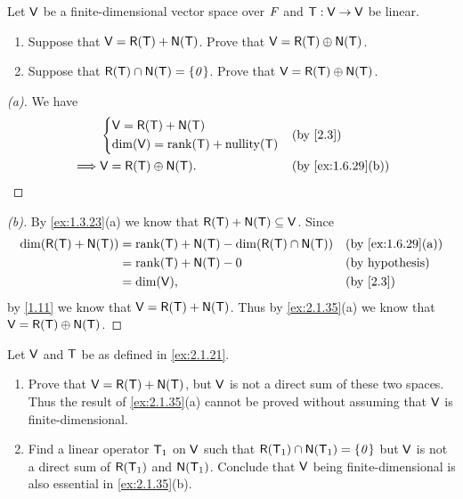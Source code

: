 \begin{ex}\label{ex:2.1.35}
  Let \(\mathsf{V}\) be a finite-dimensional vector space over \(\mathit{F}\) and \(\mathsf{T} : \mathsf{V} \to \mathsf{V}\) be linear.
  \begin{enumerate}
    \item Suppose that \(\V = \rg{\T} + \ns{\T}\).
          Prove that \(\V = \rg{\T} \oplus \ns{\T}\).
    \item Suppose that \(\rg{\T} \cap \ns{\T} = \set{\zv}\).
          Prove that \(\V = \rg{\T} \oplus \ns{\T}\).
  \end{enumerate}
\end{ex}

\begin{proof}[(a)]
  We have
  \begin{align*}
             & \begin{dcases}
      \V = \rg{\T} + \ns{\T} \\
      \dim(\V) = \rk{\T} + \nt{\T}
    \end{dcases}  &  & \text{(by \cref{2.3})}          \\
    \implies & \V = \rg{\T} \oplus \ns{\T}. &  & \text{(by \cref{ex:1.6.29}(b))}
  \end{align*}
\end{proof}

\begin{proof}[(b)]
  By \cref{ex:1.3.23}(a) we know that \(\rg{\T} + \ns{\T} \subseteq \V\).
  Since
  \begin{align*}
    \dim(\rg{\T} + \ns{\T}) & = \rk{\T} + \ns{\T} - \dim(\rg{\T} \cap \ns{\T}) &  & \text{(by \cref{ex:1.6.29}(a))} \\
                            & = \rk{\T} + \ns{\T} - 0                          &  & \text{(by hypothesis)}          \\
                            & = \dim(\V),                                      &  & \text{(by \cref{2.3})}
  \end{align*}
  by \cref{1.11} we know that \(\V = \rg{\T} + \ns{\T}\).
  Thus by \cref{ex:2.1.35}(a) we know that \(\V = \rg{\T} \oplus \ns{\T}\).
\end{proof}

\begin{ex}\label{ex:2.1.36}
  Let \(\mathsf{V}\) and \(\mathsf{T}\) be as defined in \cref{ex:2.1.21}.
  \begin{enumerate}
    \item Prove that \(\V = \rg{\T} + \ns{\T}\), but \(\mathsf{V}\) is not a direct sum of these two spaces.
          Thus the result of \cref{ex:2.1.35}(a) cannot be proved without assuming that \(\mathsf{V}\) is finite-dimensional.
    \item Find a linear operator \(\mathsf{T}_1\) on \(\mathsf{V}\) such that \(\rg{\T_1} \cap \ns{\T_1} = \set{\zv}\) but \(\mathsf{V}\) is not a direct sum of \(\rg{\T_1}\) and \(\ns{\T_1}\).
          Conclude that \(\mathsf{V}\) being finite-dimensional is also essential in \cref{ex:2.1.35}(b).
  \end{enumerate}
\end{ex}

